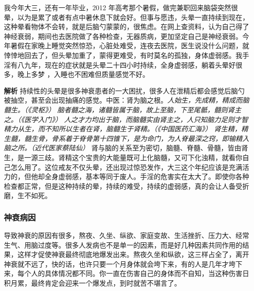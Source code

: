 \begin{case}[神经衰弱]
    我今年大三，还有一年毕业，2012 年高考那个暑假，做完兼职回来脑袋突然很晕，以为是累了或者有点中暑休息下就会好。但事与愿违，头晕一直持续到现在，这种晕看物体不会转，就是后脑勺蒙蒙的，很焦虑。在网上查资料，认为自己得了神经衰弱，期间也去医院做了各种检查，无器质病，更加坚定自己是神经衰弱。今年暑假在家晚上睡觉突然惊恐，心脏处难受，连夜去医院，医生说没什么问题，就悻悻地回去了，但头晕加重了，蒙得更难受，有时莫名的孤独，身体虚弱感。我手淫有八九年，现在的症状就是头晕二十四小时持续，全身虚弱感，躺着头晕好很多，晚上多梦 ，入睡也不困难但质量感觉不好。

    \textbf{解析} 持续性的头晕是很多神衰患者的一大困扰，很多人在泄精后都会感觉后脑勺被抽空，甚至会出现抽痛的感觉。中医：肾为脑之根。\textit{人始生，先成精，精成而脑髓生。（《灵枢》）} \textit{脑者髓之海，诸髓皆属于脑，故上至脑，下至尾骶，髓则肾主之。（《医学入门》）} \textit{人之才力均出于脑，而脑髓实由肾主之，人只知脑力足则才智精力从生，而不知所以生者在肾，脑髓生于肾精。（《中国医药汇海》）} \textit{肾生精，精生髓，髓生骨，骨系着于脊骨第十四锥下，是为命门，为人脊最深之窍，即输精入脑之所。（近代医家蔡陆仙）} 肾与脑的关系至为密切，脑髓、脊髓、骨髓，皆由肾生，是一源三歧。肾精这个宝贵的大能量既可上化脑髓，又可下化浊精，就看你自己怎么用了。这位戒友不仅头晕，还出现过惊恐发作，大三这个年纪应该是充满活力的，但他却全身虚弱感，基本等同于废人。手淫的危害实在太大了。即使你各种检查都正常，但是这种持续的晕，持续的难受，持续的虚弱感，真的会让人备受折磨，生不如死。
\end{case}

\subsubsection{神衰病因}

导致神衰的原因有很多，熬夜、久坐、纵欲、家庭变故、生活挫折、压力大、经常生气、用脑过度等。很多人发病也不是单一的因素，而是好几种因素共同作用的结果，这样才促使神衰最终彻底地爆发出来。熬夜久坐和纵欲，这三样占全了，离开神衰就不远了，快的话，也许只要一个月身体就会垮下来，有的人是几年才垮下来，每个人的具体情况都不同。你一直在伤害自己的身体而不自知，当这种伤害日积月累，最终肯定会迎来一个爆发点，到时就苦不堪言了。

